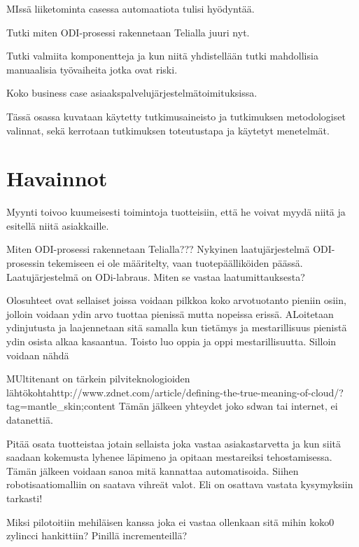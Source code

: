 \documentclass[finnish,12pt,a4paper,pdftex]{article}
\begin{document}
MIssä liiketominta casessa automaatiota tulisi hyödyntää. 

Tutki miten ODI-prosessi rakennetaan Telialla juuri nyt.

Tutki valmiita komponentteja ja kun niitä yhdistellään tutki mahdollisia manuaalisia työvaiheita jotka ovat riski.

Koko business case asiaakspalvelujärjestelmätoimituksissa.

Tässä osassa kuvataan käytetty tutkimusaineisto ja
tutkimuksen metodologiset valinnat, sekä
kerrotaan tutkimuksen toteutustapa ja käytetyt menetelmät. 

\clearpage

\section{Havainnot}

Myynti toivoo kuumeisesti toimintoja tuotteisiin, että he voivat myydä niitä ja esitellä niitä asiakkaille.

Miten ODI-prosessi rakennetaan Telialla???
Nykyinen laatujärjestelmä ODI-prosessin tekemiseen ei ole määritelty, vaan tuotepäälliköiden päässä.
Laatujärjestelmä on ODi-labraus. Miten se vastaa laatumittauksesta?

Olosuhteet ovat sellaiset joissa voidaan pilkkoa koko arvotuotanto pieniin osiin, jolloin voidaan ydin arvo tuottaa pienissä mutta nopeissa erissä. ALoitetaan ydinjutusta ja laajennetaan sitä samalla kun tietämys ja mestarillisuus pienistä ydin osista alkaa kasaantua. Toisto luo oppia ja oppi mestarillisuutta. Silloin voidaan nähdä 

MUltitenant on tärkein pilviteknologioiden lähtökohtahttp://www.zdnet.com/article/defining-the-true-meaning-of-cloud/?tag=mantle_skin;content
Tämän jälkeen yhteydet joko sdwan tai internet, ei datanettiä.

Pitää osata tuotteistaa jotain sellaista joka vastaa asiakastarvetta ja kun siitä saadaan kokemusta lyhenee läpimeno ja opitaan mestareiksi tehostamisessa. Tämän jälkeen voidaan sanoa mitä kannattaa automatisoida. Siihen robotisaatiomalliin on saatava vihreät valot. Eli on osattava vastata kysymyksiin tarkasti!

Miksi pilotoitiin mehiläisen kanssa joka ei vastaa ollenkaan sitä mihin koko0 zylincci hankittiin? Pinillä incrementeillä?
\end{document}
